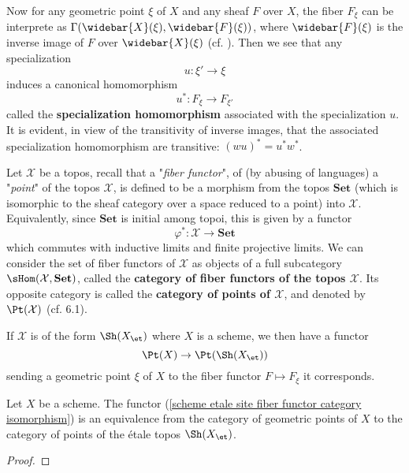 Now for any geometric point $\xi$ of $X$ and any sheaf $F$ over $X$, the fiber $F_\xi$ can be interprete as $\Gamma(\widebar{X}(\xi),\widebar{F}(\xi))$, where $\widebar{F}(\xi)$ is the inverse image of $F$ over $\widebar{X}(\xi)$ (cf. \cite{SGA4-2} ). Then we see that any specialization
\[u:\xi'\to\xi\]
induces a canonical homomorphism
\[u^*:F_\xi\to F_{\xi'}\]
called the \textbf{specialization homomorphism} associated with the specialization $u$. It is evident, in view of the transitivity of inverse images, that the associated specialization homomorphism are transitive: $(wu)^*=u^*w^*$.\par
Let $\mathcal{X}$ be a topos, recall that a "\textit{fiber functor}", of (by abusing of languages) a "\textit{point}" of the topos $\mathcal{X}$, is defined to be a morphism from the topos $\mathbf{Set}$ (which is isomorphic to the sheaf category over a space reduced to a point) into $\mathcal{X}$. Equivalently, since $\mathbf{Set}$ is initial among topoi, this is given by a functor
\[\varphi^*:\mathcal{X}\to\mathbf{Set}\]
which commutes with inductive limits and finite projective limits. We can consider the set of fiber functors of $\mathcal{X}$ as objects of a full subcategory $\sHom(\mathcal{X},\mathbf{Set})$, called the \textbf{category of fiber functors of the topos $\mathcal{X}$}. Its opposite category is called the \textbf{category of points of $\mathcal{X}$}, and denoted by $\Pt(\mathcal{X})$ (cf. \cite{SGA4-1}  6.1).\par
If $\mathcal{X}$ is of the form $\Sh(X_\et)$ where $X$ is a scheme, we then have a functor
\begin{equation}\label{scheme etale site fiber functor category isomorphism-1}
\Pt(X)\to\Pt(\Sh(X_\et))
\end{equation}
sending a geometric point $\xi$ of $X$ to the fiber functor $F\mapsto F_\xi$ it corresponds.

\begin{theorem}\label{scheme etale site fiber functor category isomorphism}
Let $X$ be a scheme. The functor (\ref{scheme etale site fiber functor category isomorphism}) is an equivalence from the category of geometric points of $X$ to the category of points of the \'etale topos $\Sh(X_\et)$.
\end{theorem}
\begin{proof}

\end{proof}

